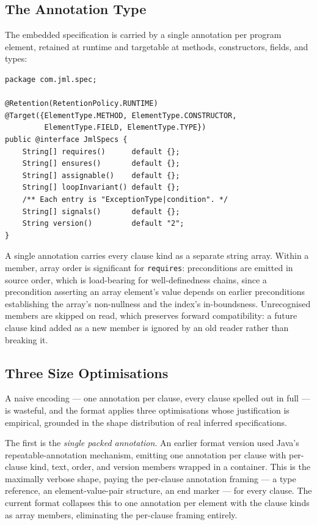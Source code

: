 \subsection{The Annotation Type}

The embedded specification is carried by a single annotation per program
element, retained at runtime and targetable at methods, constructors, fields,
and types:

\begin{lstlisting}
package com.jml.spec;

@Retention(RetentionPolicy.RUNTIME)
@Target({ElementType.METHOD, ElementType.CONSTRUCTOR,
         ElementType.FIELD, ElementType.TYPE})
public @interface JmlSpecs {
    String[] requires()      default {};
    String[] ensures()       default {};
    String[] assignable()    default {};
    String[] loopInvariant() default {};
    /** Each entry is "ExceptionType|condition". */
    String[] signals()       default {};
    String version()         default "2";
}
\end{lstlisting}

A single annotation carries every clause kind as a separate string array. Within
a member, array order is significant for \texttt{requires}: preconditions are
emitted in source order, which is load-bearing for well-definedness chains,
since a precondition asserting an array element's value depends on earlier
preconditions establishing the array's non-nullness and the index's
in-boundsness. Unrecognised members are skipped on read, which preserves forward
compatibility: a future clause kind added as a new member is ignored by an old
reader rather than breaking it.

\subsection{Three Size Optimisations}

A naive encoding --- one annotation per clause, every clause spelled out in full
--- is wasteful, and the format applies three optimisations whose justification
is empirical, grounded in the shape distribution of real inferred specifications.

The first is the \emph{single packed annotation}. An earlier format version used
Java's repeatable-annotation mechanism, emitting one annotation per clause with
per-clause kind, text, order, and version members wrapped in a container. This
is the maximally verbose shape, paying the per-clause annotation framing --- a
type reference, an element-value-pair structure, an end marker --- for every
clause. The current format collapses this to one annotation per element with the
clause kinds as array members, eliminating the per-clause framing entirely.

